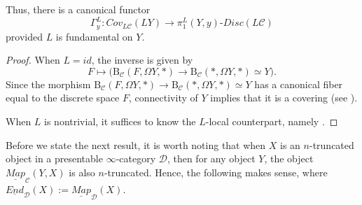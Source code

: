 Thus, there is a canonical functor $$\Gamma_y^L:Cov_{L\mathcal{C}}(LY)\longrightarrow \pi_1^L(Y,y)\mbox{-}Disc(L\mathcal{C})$$ provided $L$ is fundamental on $Y$.
\begin{proof}
When $L=id$, the inverse is given by $$F\mapsto \big (\mathrm{B}_\mathcal{C}(F,\Omega Y,*)\to \mathrm{B}_\mathcal{C}(*,\Omega Y,*)\simeq Y \big ).$$ Since the morphism $\mathrm{B}_\mathcal{C}(F,\Omega Y,*)\to \mathrm{B}_\mathcal{C}(*,\Omega Y,*)\simeq Y$ has a canonical fiber equal to the discrete space $F$, connectivity of $Y$ implies that it is a covering (see ).

  When $L$ is nontrivial, it suffices to know the $L$-local counterpart, namely .
\end{proof}
Before we state the next result, it is worth noting that when $X$ is an $n$-truncated object in a presentable $\infty$-category $\mathcal{D}$, then for any object $Y$, the object $\underline{Map}_\mathcal{C}(Y,X)$ is also $n$-truncated. Hence, the following makes sense, where $\underline{End}_\mathcal{D}(X):=\underline{Map}_\mathcal{D}(X)$.
